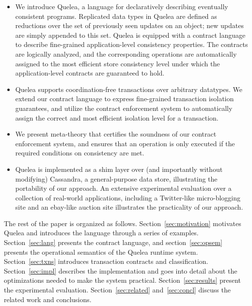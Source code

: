 \begin{itemize}

\item We introduce Quelea, a language for declaratively describing eventually
consistent programs. Replicated data types in Quelea are defined as reductions
over the set of previously seen updates on an object; new updates are simply
appended to this set. Quelea is equipped with a contract language to describe
fine-grained application-level consistency properties. The contracts are
logically analyzed, and the corresponding operations are automatically assigned
to the most efficient store consistency level under which the application-level
contracts are guaranteed to hold.

\item Quelea supports coordination-free transactions over arbitrary datatypes.
We extend our contract language to express fine-grained transaction isolation
guarantees, and utilize the contract enforcement system to automatically assign
the correct and most efficient isolation level for a transaction.

\item We present meta-theory that certifies the soundness of our contract
enforcement system, and ensures that an operation is only executed if the
required conditions on consistency are met.

\item Quelea is implemented as a shim layer over (and importantly without
modifying) Cassandra, a general-purpose data store, illustrating the
portability of our approach. An extensive experimental evaluation over a
collection of real-world applications, including a Twitter-like micro-blogging
site and an ebay-like auction site illustrates the practicality of our
approach.

\end{itemize}

The rest of the paper is organized as follows. Section~\ref{sec:motivation}
motivates Quelea and introduces the language through a series of examples.
Section~\ref{sec:lang} presents the contract language, and
section~\ref{sec:opsem} presents the operational semantics of the Quelea
runtime system. Section~\ref{sec:txns} introduces transaction contracts and
classification. Section~\ref{sec:impl} describes the implementation and goes
into detail about the optimizations needed to make the system practical.
Section~\ref{sec:results} present the experimental evaluation.
Section~\ref{sec:related} and~\ref{sec:concl} discuss the related work and
conclusions.
